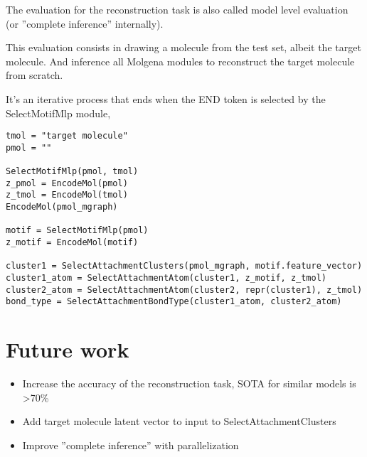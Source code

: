 \documentclass{article}
\begin{document}
The evaluation for the reconstruction task is also called model level evaluation (or ''complete inference'' internally).

This evaluation consists in drawing a molecule from the test set, albeit the target molecule.
And inference all Molgena modules to reconstruct the target molecule from scratch.

It's an iterative process that ends when the END token is selected by the SelectMotifMlp module, 

\begin{lstlisting}
tmol = "target molecule"
pmol = ""

SelectMotifMlp(pmol, tmol)
z_pmol = EncodeMol(pmol)
z_tmol = EncodeMol(tmol)
EncodeMol(pmol_mgraph)

motif = SelectMotifMlp(pmol)
z_motif = EncodeMol(motif)

cluster1 = SelectAttachmentClusters(pmol_mgraph, motif.feature_vector)
cluster1_atom = SelectAttachmentAtom(cluster1, z_motif, z_tmol)
cluster2_atom = SelectAttachmentAtom(cluster2, repr(cluster1), z_tmol)
bond_type = SelectAttachmentBondType(cluster1_atom, cluster2_atom)
\end{lstlisting}


\section{Future work}

\begin{itemize}
\item Increase the accuracy of the reconstruction task, SOTA for similar models is >70\%
\item Add target molecule latent vector to input to SelectAttachmentClusters
\item Improve ''complete inference'' with parallelization
\end{itemize}
\end{document}
